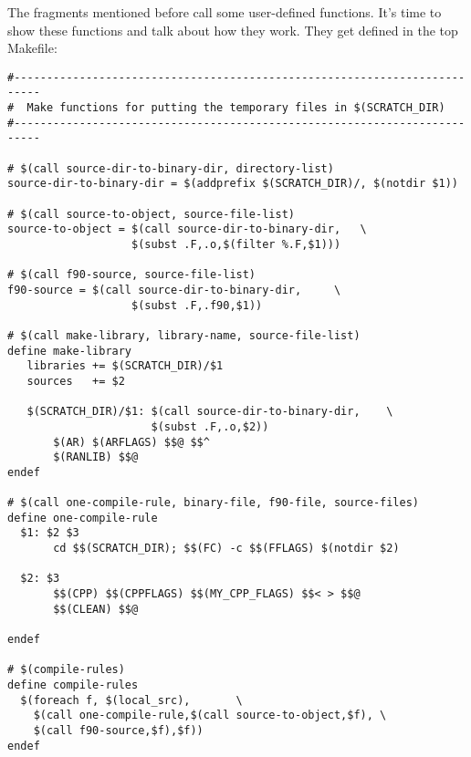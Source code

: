 The  fragments mentioned before call some
user-defined functions.  It's time to show these functions and
talk about how they work. They get defined in the top Makefile:
\begin{verbatim}
#--------------------------------------------------------------------------
#  Make functions for putting the temporary files in $(SCRATCH_DIR)
#--------------------------------------------------------------------------

# $(call source-dir-to-binary-dir, directory-list)
source-dir-to-binary-dir = $(addprefix $(SCRATCH_DIR)/, $(notdir $1))

# $(call source-to-object, source-file-list)
source-to-object = $(call source-dir-to-binary-dir,   \
                   $(subst .F,.o,$(filter %.F,$1)))

# $(call f90-source, source-file-list)
f90-source = $(call source-dir-to-binary-dir,     \
                   $(subst .F,.f90,$1))

# $(call make-library, library-name, source-file-list)
define make-library
   libraries += $(SCRATCH_DIR)/$1
   sources   += $2

   $(SCRATCH_DIR)/$1: $(call source-dir-to-binary-dir,    \
                      $(subst .F,.o,$2))
       $(AR) $(ARFLAGS) $$@ $$^
       $(RANLIB) $$@
endef

# $(call one-compile-rule, binary-file, f90-file, source-files)
define one-compile-rule
  $1: $2 $3
       cd $$(SCRATCH_DIR); $$(FC) -c $$(FFLAGS) $(notdir $2)

  $2: $3
       $$(CPP) $$(CPPFLAGS) $$(MY_CPP_FLAGS) $$< > $$@
       $$(CLEAN) $$@

endef

# $(compile-rules)
define compile-rules
  $(foreach f, $(local_src),       \
    $(call one-compile-rule,$(call source-to-object,$f), \
    $(call f90-source,$f),$f))
endef
\end{verbatim}

